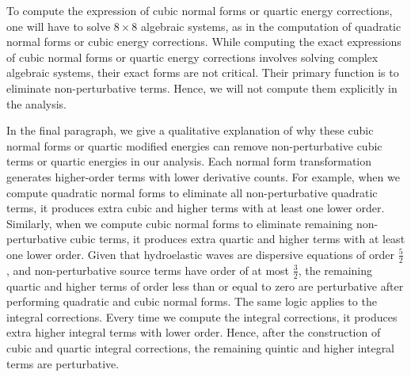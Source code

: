 \documentclass[10pt]{amsart}
\theoremstyle{remark}
\theoremstyle{definition}
\numberwithin{equation}{section}
\newcommand{\f}{\frac}
\begin{document}
To compute the expression of cubic normal forms or quartic  energy corrections, one will have to solve $8\times 8$ algebraic systems, as in the computation of quadratic normal forms or cubic energy corrections.
While computing the exact expressions of cubic normal forms  or quartic energy corrections involves solving complex algebraic systems, their exact forms are not critical.
Their primary function is to eliminate non-perturbative terms.
Hence, we will not compute them explicitly in the analysis.

In the final paragraph, we give a qualitative explanation of why these cubic normal forms or quartic modified energies can remove non-perturbative cubic terms or quartic energies in our analysis.
Each normal form transformation generates higher-order terms with lower derivative counts. 
For example, when we compute quadratic normal forms to eliminate all non-perturbative quadratic terms, it produces extra cubic and higher terms with at least one lower order.
Similarly, when we compute cubic normal forms to eliminate remaining non-perturbative cubic terms, it produces extra quartic and higher terms with at least one lower order.
Given that hydroelastic waves are dispersive equations of order $\f52$, and non-perturbative source terms have order of at most $\f32$,  the remaining quartic and higher terms of order less than or equal to zero are perturbative after performing quadratic and cubic normal forms.
The same logic applies to the integral corrections.
Every time we compute the integral corrections, it produces extra higher integral terms with lower order.
Hence, after the construction of cubic and quartic integral corrections, the remaining quintic and higher integral terms are perturbative.




	
\end{document}
